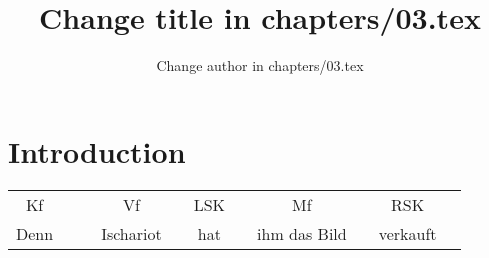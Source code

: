 \documentclass[output=paper]{LSP/langsci}
\author{Change author in chapters/03.tex}
\title{Change title in chapters/03.tex}
\begin{document}
\section{Introduction} 
 \lipsum
 

\printbibliography[heading=subbibliography,notkeyword=this]
\begin{table}
\setlength{\tabcolsep}{1pt}
\small
\begin{tabular}{cc||ccccccccc}
Kf &&& Vf && LSK && Mf && RSK\\
\hhline{-~-~-~-~-~}
Denn &&& Ischariot && hat &&  ihm  das Bild && verkauft\\
\end{tabular}
\end{table}
\end{document}

